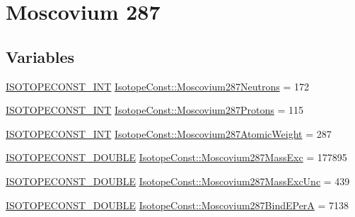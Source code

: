 \hypertarget{group___isotope_const-_moscovium-_mc287}{}\section{Moscovium 287}
\label{group___isotope_const-_moscovium-_mc287}
\subsection*{Variables}
\begin{DoxyCompactItemize}
\item 
\mbox{\hyperlink{group___isotope_const-_macros_ga5f18360b3e99483a35c32d789e62621c}{I\+S\+O\+T\+O\+P\+E\+C\+O\+N\+S\+T\+\_\+\+I\+NT}} \mbox{\hyperlink{group___isotope_const-_moscovium-_mc287_ga7e37d696ff5271eb0316f010ba192c84}{Isotope\+Const\+::\+Moscovium287\+Neutrons}} = 172
\item 
\mbox{\hyperlink{group___isotope_const-_macros_ga5f18360b3e99483a35c32d789e62621c}{I\+S\+O\+T\+O\+P\+E\+C\+O\+N\+S\+T\+\_\+\+I\+NT}} \mbox{\hyperlink{group___isotope_const-_moscovium-_mc287_gaf95e8567dd1a1bcd9d3080196a0b6900}{Isotope\+Const\+::\+Moscovium287\+Protons}} = 115
\item 
\mbox{\hyperlink{group___isotope_const-_macros_ga5f18360b3e99483a35c32d789e62621c}{I\+S\+O\+T\+O\+P\+E\+C\+O\+N\+S\+T\+\_\+\+I\+NT}} \mbox{\hyperlink{group___isotope_const-_moscovium-_mc287_ga7713eba99364ff757670f25b0a0c8823}{Isotope\+Const\+::\+Moscovium287\+Atomic\+Weight}} = 287
\item 
\mbox{\hyperlink{group___isotope_const-_macros_ga8f45a7272ce02c0b4c65c44636ed719a}{I\+S\+O\+T\+O\+P\+E\+C\+O\+N\+S\+T\+\_\+\+D\+O\+U\+B\+LE}} \mbox{\hyperlink{group___isotope_const-_moscovium-_mc287_gaa7438b0f2559e750458a0abe62fa19a6}{Isotope\+Const\+::\+Moscovium287\+Mass\+Exc}} = 177895
\item 
\mbox{\hyperlink{group___isotope_const-_macros_ga8f45a7272ce02c0b4c65c44636ed719a}{I\+S\+O\+T\+O\+P\+E\+C\+O\+N\+S\+T\+\_\+\+D\+O\+U\+B\+LE}} \mbox{\hyperlink{group___isotope_const-_moscovium-_mc287_ga7b90cb4fb83233ef53e0f737caacb594}{Isotope\+Const\+::\+Moscovium287\+Mass\+Exc\+Unc}} = 439
\item 
\mbox{\hyperlink{group___isotope_const-_macros_ga8f45a7272ce02c0b4c65c44636ed719a}{I\+S\+O\+T\+O\+P\+E\+C\+O\+N\+S\+T\+\_\+\+D\+O\+U\+B\+LE}} \mbox{\hyperlink{group___isotope_const-_moscovium-_mc287_ga0e9354fa6b7e8d901394672a15fe5f83}{Isotope\+Const\+::\+Moscovium287\+Bind\+E\+PerA}} = 7138
\item 

\end{DoxyCompactItemize}

